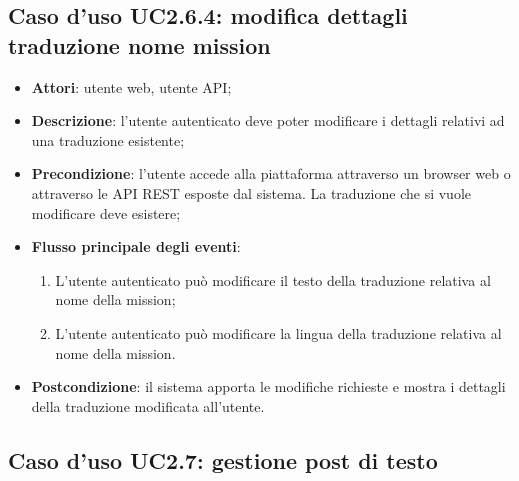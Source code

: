 \subsection{Caso d'uso UC2.6.4: modifica dettagli traduzione nome mission}
\begin{itemize}
\item \textbf{Attori}: utente web, utente API;
\item \textbf{Descrizione}: l'utente autenticato deve poter modificare i dettagli relativi ad una traduzione esistente; 
      \item \textbf{Precondizione}: l'utente accede alla piattaforma attraverso un browser web o attraverso le API REST esposte dal sistema. La traduzione che si vuole modificare deve esistere;

        \item \textbf{Flusso principale degli eventi}:
          \begin{enumerate}
          \item L'utente autenticato può modificare il testo della traduzione relativa al nome della mission;
          \item L'utente autenticato può modificare la lingua della traduzione relativa al nome della mission.

      \end{enumerate}
    \item \textbf{Postcondizione}: il sistema apporta le modifiche richieste e mostra i dettagli della traduzione modificata all'utente.
  \end{itemize}

\hypertarget{UC2.7}{}
\subsection{Caso d'uso UC2.7: gestione post di testo}

